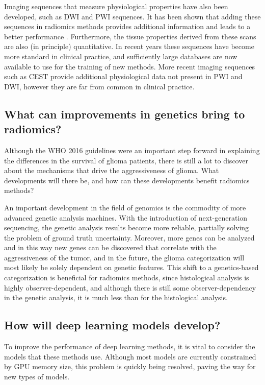 Imaging sequences that measure physiological properties have also been developed, such as \gls{DWI} and \gls{PWI} sequences.
It has been shown that adding these sequences in radiomics methods provides additional information and leads to a better performance \autocite{park2020radiomicspwi,kim2020diffusion}.
Furthermore, the tissue properties derived from these scans are also (in principle) quantitative.
In recent years these sequences have become more standard in clinical practice, and sufficiently large databases are now available to use for the training of new methods.
More recent imaging sequences such as \gls{CEST} provide additional physiological data not present in \gls{PWI} and \gls{DWI}, however they are far from common in clinical practice.



\subsection{What can improvements in genetics bring to radiomics?}\label{sec:discussion_new_genetics}
Although the \gls{WHO} 2016 guidelines were an important step forward in explaining the differences in the survival of glioma patients, there is still a lot to discover about the mechanisms that drive the aggressiveness of glioma.
What developments will there be, and how can these developments benefit radiomics methods?

An important development in the field of genomics is the commodity of more advanced genetic analysis machines.
With the introduction of next-generation sequencing, the genetic analysis results become more reliable, partially solving the problem of ground truth uncertainty.
Moreover, more genes can be analyzed and in this way new genes can be discovered that correlate with the aggressiveness of the \gls{tumor}, and in the future, the glioma categorization will most likely be solely dependent on genetic features.
This shift to a genetics-based categorization is beneficial for radiomics methods, since histological analysis is highly observer-dependent, and although there is still some observer-dependency in the genetic analysis, it is much less than for the histological analysis.


\subsection{How will deep learning models develop?}

To improve the performance of deep learning methods, it is vital to consider the models that these methods use.
Although most models are currently constrained by GPU memory size, this problem is quickly being resolved, paving the way for new types of models.

